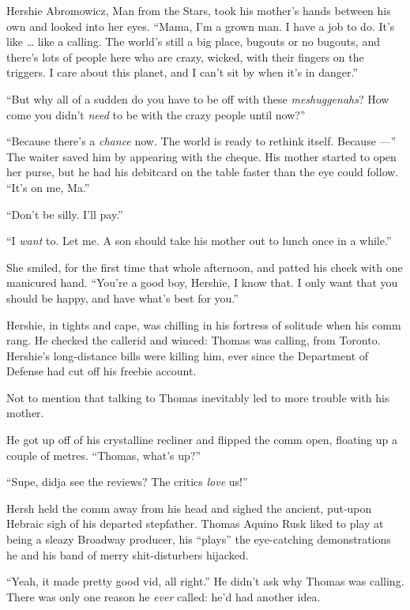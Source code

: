 Hershie Abromowicz, Man from the Stars, took his mother's hands
between his own and looked into her eyes.
``Mama, I'm a grown man. I have a job to do. It's like \ldots{} like a calling. 
The world's still a big place, bugouts or no bugouts, and there's lots of 
people here who are crazy, wicked, with their fingers on the triggers. I care 
about this planet, and I can't sit by when it's in danger.''

``But why all of a sudden do you have to be off with these \emph{meshuggenahs}? 
How come you didn't \emph{need} to be with the crazy people until now?''

``Because there's a \emph{chance} now. The world is ready to rethink itself. 
Because ---''
The waiter saved him by appearing with the cheque. His mother
started to open her purse, but he had his debitcard on the table
faster than the eye could follow. ``It's on me, Ma.''

``Don't be silly. I'll pay.''

``I \emph{want} to. Let me. A son should take his mother out to lunch once in a 
while.''

She smiled, for the first time that whole afternoon, and patted his
cheek with one manicured hand.
``You're a good boy, Hershie, I know that. I only want that you should be 
happy, and have what's best for you.''

\tb

Hershie, in tights and cape, was chilling in his fortress of
solitude when his comm rang. He checked the callerid and winced:
Thomas was calling, from Toronto. Hershie's long-distance bills
were killing him, ever since the Department of Defense had cut off
his freebie account.

Not to mention that talking to Thomas inevitably led to more
trouble with his mother.

He got up off of his crystalline recliner and flipped the comm
open, floating up a couple of metres. ``Thomas, what's up?''

``Supe, didja see the reviews? The critics \emph{love} us!''

Hersh held the comm away from his head and sighed the ancient,
put-upon Hebraic sigh of his departed stepfather. Thomas Aquino
Rusk liked to play at being a sleazy Broadway producer, his
``plays'' the eye-catching demonstrations he and his band of merry
shit-disturbers hijacked.

``Yeah, it made pretty good vid, all right.'' He didn't ask why
Thomas was calling. There was only one reason he \emph{ever}
called: he'd had another idea.

